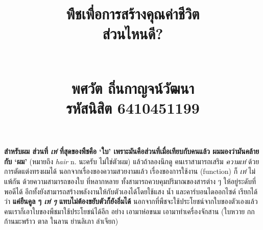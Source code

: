 \documentclass{article}
\title{\flushleft\Large พืชเพื่อการสร้างคุณค่าชีวิต\\
\Huge\textbf{ส่วนไหนดี?}\\
\rule{0em}{1ex}\\
\normalsize พศวัต ถิ่นกาญจน์วัฒนา\\
รหัสนิสิต 6410451199
\vspace{-8ex}}
\author{}
\date{}
\begin{document}
\maketitle
\sloppy\flushleft
\textbf{สำหรับผม ส่วนที่ \textit{เท่} ที่สุดของพืชคือ `ใบ' เพราะมันคือส่วนที่เมื่อเทียบกับคนแล้ว ผมมองว่ามันคล้ายกับ `ผม'} (\mbox{หมายถึง} \textit{hair} n. นะครับ ไม่ใช่ตัวผม)
แล้วถ้าลองนึกดู คนเราสามารถเสริม \textit{ความเท่} ด้วยการตัดแต่งทรงผมได้ นอกจากเรื่องของความสวยงามแล้ว เรื่องของการใช้งาน (function) ก็ \textit{เท่} ไม่แพ้กัน ด้วยความสามารถของใบ
ที่หลากหลาย ทั้งสามารถควบคุมปริมาณของสารต่าง ๆ ให้อยู่ระดับที่พอดีได้ อีกทั้งยังสามารถสร้างพลังงานให้กับตัวเองได้โดยใช้แสง น้ำ และคาร์บอนไดออกไซด์
เรียกได้ว่า \textbf{แค่ยืนคูล ๆ \textit{เท่ ๆ} แทบไม่ต้องขยับตัวก็ยังอิ่มได้} นอกจากที่พืชจะใช้ประโยชน์จากใบของตัวเองแล้ว
คนเราก็เอาใบของพืชมาใช้ประโยชน์ได้อีก อย่าง เอามาห่อขนม เอามาทำเครื่องจักสาน (ใบหวาย กก ก้านมะพร้าว ตาล ในลาน ย่านลิเภา ลำเจียก)
\end{document}
